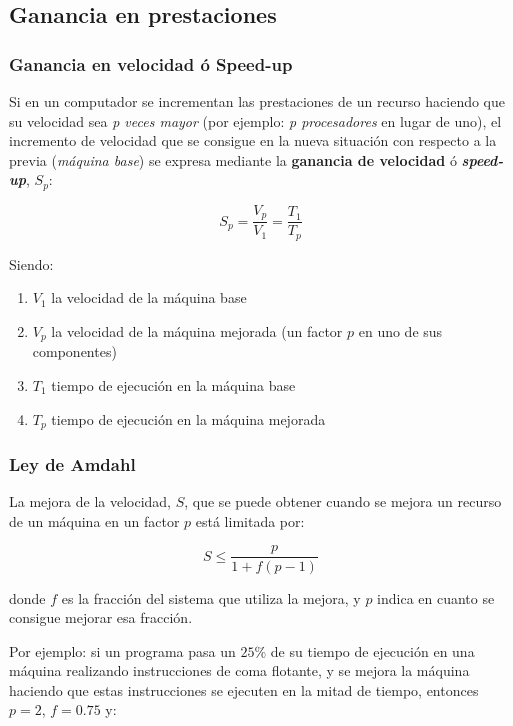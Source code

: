 \documentclass[10pt,a4paper,spanish]{report}
\begin{document}
\textcolor[rgb]{0.2,0.4,0.8}{\subsection{Ganancia en prestaciones}}
\textcolor[rgb]{0.2,0.4,0.8}{\subsubsection{Ganancia en velocidad ó Speed-up}}
Si en un computador se incrementan las prestaciones de un recurso haciendo que su velocidad sea \textit{\textcolor[rgb]{0.2,0.4,0.8}{p veces mayor}} (por ejemplo: \textit{\textcolor[rgb]{0.2,0.4,0.8}{p procesadores}} en lugar de uno), el incremento de velocidad que se consigue en la nueva situación con respecto a la previa (\textit{\textcolor[rgb]{0.2,0.4,0.8}{máquina base}}) se expresa mediante la \textbf{\textcolor[rgb]{0.2,0.4,0.8}{ganancia de velocidad}} ó \textbf{\textcolor[rgb]{0.2,0.4,0.8}{\textit{speed-up}}}, $S_p$:

\begin{displaymath}
S_p = \frac{V_p}{V_1} = \frac{T_1}{T_p}
\end{displaymath}

Siendo:
\begin{enumerate}[\color{azul}{\bf $\heartsuit$}]
  \item $V_1$ la velocidad de la máquina base
  \item $V_p$ la velocidad de la máquina mejorada (un factor $p$ en uno de sus componentes)
  \item $T_1$ tiempo de ejecución en la máquina base
  \item $T_p$ tiempo de ejecución en la máquina mejorada
\end{enumerate}

\textcolor[rgb]{0.2,0.4,0.8}{\subsubsection{Ley de Amdahl}}
La mejora de la velocidad, $S$, que se puede obtener cuando se mejora un recurso de un máquina en un factor $p$ está limitada por:

\begin{displaymath}
S \leq \frac{p}{1+f(p-1)}
\end{displaymath}

donde $f$ es la fracción del sistema que utiliza la mejora, y $p$ indica en cuanto se consigue mejorar esa fracción.

Por ejemplo: si un programa pasa un $25\%$ de su tiempo de ejecución en una máquina realizando instrucciones de coma flotante, y se mejora la máquina haciendo que estas instrucciones se ejecuten en la mitad de tiempo, entonces $p=2$, $f=0.75$ y:
\end{document}
